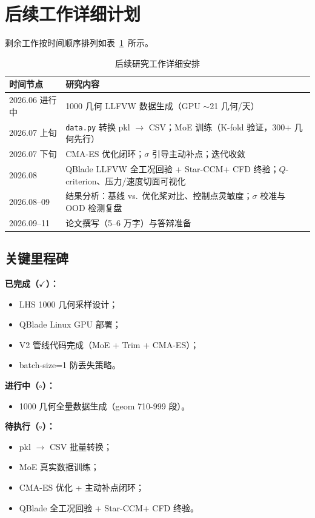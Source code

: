 \section{后续工作详细计划}

剩余工作按时间顺序排列如表~\ref{tab:future_plan_full}~所示。

\begin{table}[htbp]
\centering
\caption{后续研究工作详细安排}
\label{tab:future_plan_full}
\begin{tabular}{lp{8cm}}
\toprule
\textbf{时间节点} & \textbf{研究内容} \\
\midrule
2026.06 进行中 & 1000 几何 LLFVW 数据生成（GPU $\sim$21 几何/天） \\
2026.07 上旬 & \texttt{data.py} 转换 pkl $\to$ CSV；MoE 训练（K-fold 验证，300+ 几何先行） \\
2026.07 下旬 & CMA-ES 优化闭环；$\sigma$ 引导主动补点；迭代收敛 \\
2026.08 & QBlade LLFVW 全工况回验 + Star-CCM+ CFD 终验；$Q$-criterion、压力/速度切面可视化 \\
2026.08--09 & 结果分析：基线 vs.\ 优化桨对比、控制点灵敏度；$\sigma$ 校准与 OOD 检测复盘 \\
2026.09--11 & 论文撰写（5--6 万字）与答辩准备 \\
\bottomrule
\end{tabular}
\end{table}

\subsection{关键里程碑}

\textbf{已完成（$\checkmark$）：}
\begin{itemize}
  \item LHS 1000 几何采样设计；
  \item QBlade Linux GPU 部署；
  \item V2 管线代码完成（MoE + Trim + CMA-ES）；
  \item batch-size=1 防丢失策略。
\end{itemize}

\textbf{进行中（$\circ$）：}
\begin{itemize}
  \item 1000 几何全量数据生成（geom 710-999 段）。
\end{itemize}

\textbf{待执行（$\circ$）：}
\begin{itemize}
  \item pkl $\to$ CSV 批量转换；
  \item MoE 真实数据训练；
  \item CMA-ES 优化 + 主动补点闭环；
  \item QBlade 全工况回验 + Star-CCM+ CFD 终验。
\end{itemize}

